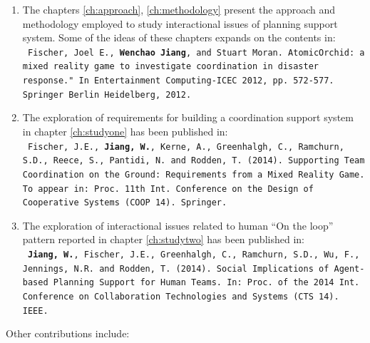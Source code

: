 \begin{enumerate}
\item The chapters \ref{ch:approach}, \ref{ch:methodology}  present the approach and methodology employed to study interactional issues of planning support system. Some of the ideas of these chapters expands on the contents in:\\
\texttt{ \footnotesize Fischer, Joel E., \textbf{Wenchao Jiang}, and Stuart Moran. AtomicOrchid: a mixed reality game to investigate coordination in disaster response." In Entertainment Computing-ICEC 2012, pp. 572-577. Springer Berlin Heidelberg, 2012.}\\

\item The exploration of requirements for building a coordination support system in chapter \ref{ch:studyone}  has been published in:\\
\texttt{ \footnotesize Fischer, J.E., \textbf{Jiang, W.}, Kerne, A., Greenhalgh, C., Ramchurn, S.D., Reece, S., Pantidi, N. and Rodden, T. (2014). Supporting Team Coordination on the Ground: Requirements from a Mixed Reality Game. To appear in: Proc. 11th Int. Conference on the Design of Cooperative Systems (COOP 14). Springer.}\\


\item The exploration of interactional issues related to human ``On the loop'' pattern reported in chapter \ref{ch:studytwo} has been published in:\\
\texttt{ \footnotesize\textbf{Jiang, W.}, Fischer, J.E., Greenhalgh, C., Ramchurn, S.D., Wu, F., Jennings, N.R. and Rodden, T. (2014). Social Implications of Agent-based Planning Support for Human Teams.  In: Proc. of the 2014 Int. Conference on Collaboration Technologies and Systems (CTS 14). IEEE.}


\end{enumerate}

Other contributions include:

